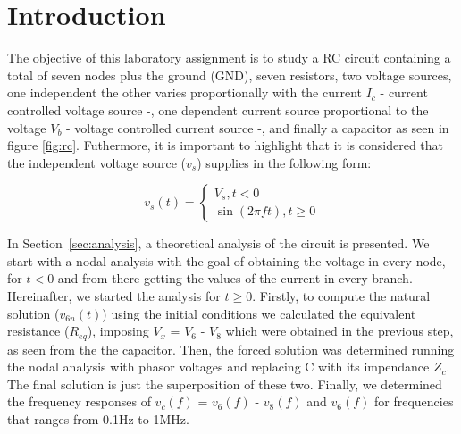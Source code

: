 \section{Introduction}
\label{sec:introduction}


The objective of this laboratory assignment is to study a RC circuit containing a total of
seven nodes plus the ground (GND), seven resistors, two voltage sources, one independent the other
varies proportionally with the current $I_c$ - current controlled voltage source -, one dependent current
source proportional to the voltage $V_b$ - voltage controlled current source -, and finally a capacitor as 
seen in figure \ref{fig:rc}.
Futhermore, it is important to highlight that it is considered that the independent voltage source ($v_{s}$) supplies
in the following form:

\begin{equation}
    v_{s}\left( t\right) =\begin{cases}V_{s},t <0\\ \sin \left( 2\pi ft\right) ,t\geq 0\end{cases}
\end{equation}




In Section~\ref{sec:analysis}, a theoretical analysis of the circuit is
presented. We start with a nodal analysis with the goal of obtaining the voltage in every node, for  $t<0$
and from there getting the values of the current in every branch.
Hereinafter, we started the analysis for $t\geq0$. Firstly, to compute the natural solution ($v_{6n}(t)$)
using the initial conditions we calculated the equivalent resistance ($R_{eq}$), imposing $V_{x}$ = $V_{6}$ - $V_{8}$ which were
obtained in the previous step, as seen from the the capacitor. Then,
the forced solution was determined running the nodal analysis with phasor voltages and
replacing C with its impendance $Z_c$. The final solution is just the superposition of these two.
Finally, we determined the frequency responses of $v_{c}(f)$ = $v_{6}(f)$ - $v_{8}(f)$ and $v_{6}(f)$ for frequencies that ranges from
0.1Hz to 1MHz.

